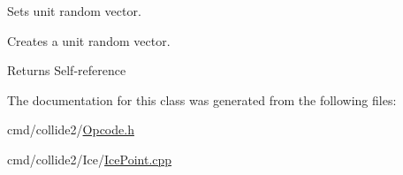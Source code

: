 Sets unit random vector. 

Creates a unit random vector. \begin{DoxyReturn}{Returns}
Self-\/reference 
\end{DoxyReturn}


The documentation for this class was generated from the following files\+:\begin{DoxyCompactItemize}
\item 
cmd/collide2/\hyperlink{Opcode_8h}{Opcode.\+h}\item 
cmd/collide2/\+Ice/\hyperlink{IcePoint_8cpp}{Ice\+Point.\+cpp}\end{DoxyCompactItemize}
